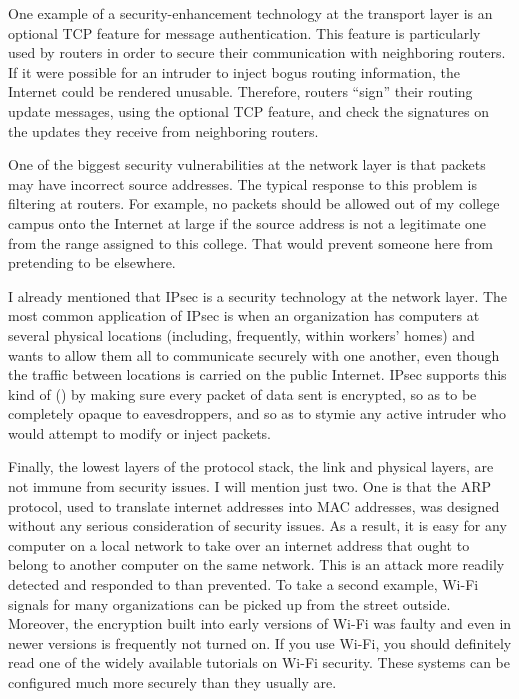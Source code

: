 One example of a security-enhancement technology at the transport
layer is an optional TCP feature for message authentication.  This
feature is particularly used by routers in order to secure their
communication with neighboring routers.  If it were possible for an
intruder to inject bogus routing information, the Internet could be
rendered unusable.  Therefore, routers ``sign'' their routing update
messages, using the optional TCP feature, and check the signatures on
the updates they receive from neighboring routers.

One of the biggest security vulnerabilities at the network layer is
that packets may have incorrect source addresses.  The typical response to
this problem is filtering at routers.  For example, no packets should
be allowed out of my college campus onto the Internet at large if the
source address is not a legitimate one from the range assigned to this
college.  That would prevent someone here from pretending to be
elsewhere.

I already mentioned that IPsec is a security technology at the network
layer.  The most common application of IPsec is when an organization
has computers at several physical locations (including, frequently,
within workers' homes) and wants to allow them all to communicate
securely with one another, even though the traffic between locations
is carried on the public Internet.  IPsec supports this kind of
 () by making sure every
packet of data sent is encrypted, so as to be completely opaque to
eavesdroppers, and so as to stymie any active intruder who would attempt
to modify or inject packets.

Finally, the lowest layers of the protocol stack, the link and
physical layers, are not immune from security issues.  I will mention
just two.  One is that the ARP protocol, used to translate internet
addresses into MAC addresses, was designed without any serious
consideration of security issues.  As a result, it is easy for any
computer on a local network to take over an internet address that
ought to belong to another computer on the same network.  This is an
attack more readily detected and responded to than prevented.  To take
a second example, Wi-Fi signals for many organizations can be picked
up from the street outside.  Moreover, the encryption built into early
versions of Wi-Fi was faulty and even in newer versions is frequently
not turned on.  If you use Wi-Fi, you should definitely read one of
the widely available tutorials on Wi-Fi security.  These systems can
be configured much more securely than they usually are.

